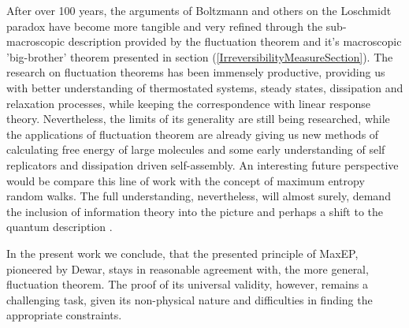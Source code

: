 \documentclass[a4paper,12pt]{article}
\begin{document}
After over 100 years, the arguments of Boltzmann and others on the Loschmidt paradox have become more tangible and very refined through the sub-macroscopic description provided by the fluctuation theorem and it's macroscopic 'big-brother' theorem presented in section (\ref{IrreversibilityMeasureSection}).
The research on fluctuation theorems has been immensely productive, providing us with better understanding of thermostated systems, steady states, dissipation and relaxation processes, while keeping the correspondence with linear response theory. Nevertheless, the limits of its generality are still being researched, while the applications of fluctuation theorem are already giving us new methods of calculating free energy of large molecules and some early understanding of self replicators and dissipation driven self-assembly. 
An interesting future perspective would be compare this line of work with the concept of maximum entropy random walks.
The full understanding, nevertheless, will almost surely, demand the inclusion of information theory into the picture and perhaps a shift to the quantum description \cite{Kurchan:2000uh}.

In the present work we conclude, that the presented principle of MaxEP, pioneered by Dewar, stays in reasonable agreement with, the more general, fluctuation theorem. The proof of its universal validity, however, remains a challenging task, given its non-physical nature and difficulties in finding the appropriate constraints.
  

\newpage



\end{document}
